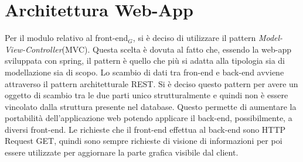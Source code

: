 \section{Architettura Web-App}\label{ArchitetturaDelProdottoWebApp}
Per il modulo relativo al front-end$_G$, si è deciso di utilizzare il pattern \textit{Model-View-Controller}(MVC).
Questa scelta è dovuta al fatto che, essendo la web-app sviluppata con spring, il pattern è quello che più si adatta alla tipologia sia di modellazione sia di scopo.
Lo scambio di dati tra fron-end e back-end avviene attraverso il pattern architetturale REST. Si è deciso questo pattern per avere un oggetto di scambio tra le due parti unico strutturalmente e quindi non è essere vincolato dalla struttura presente nel database.
Questo permette di aumentare la portabilità dell'applicazione web potendo applicare il back-end, possibilmente, a diversi front-end. Le richieste che il front-end effettua al back-end sono HTTP Request GET, quindi sono sempre richieste di visione di informazioni per poi essere utilizzate per aggiornare la parte grafica visibile dal client.
